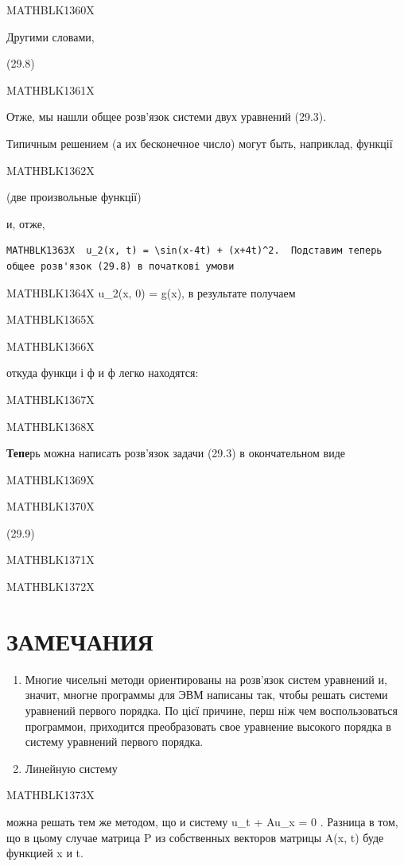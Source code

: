 \documentclass[
  ukrainian,
]{article}
\begin{document}
MATHBLK1360X

Другими словами,

(29.8)

MATHBLK1361X

Отже, мы нашли общее розв'язок системи двух уравнений (29.3).

Типичным решением (а их бесконечное число) могут быть, наприклад,
функції

MATHBLK1362X

(две произвольные функції)

и, отже,

\begin{verbatim}
MATHBLK1363X  u_2(x, t) = \sin(x-4t) + (x+4t)^2.  Подставим теперь общее розв'язок (29.8) в початкові умови
\end{verbatim}

MATHBLK1364X u\_2(x, 0) = g(x), в результате получаем

MATHBLK1365X

MATHBLK1366X

откуда функци і ф и ф легко находятся:

MATHBLK1367X

MATHBLK1368X

\textbf{Тепе}рь можна написать розв'язок задачи (29.3) в окончательном
виде

MATHBLK1369X

MATHBLK1370X

(29.9)

MATHBLK1371X

MATHBLK1372X

\section{ЗАМЕЧАНИЯ}\label{ux437ux430ux43cux435ux447ux430ux43dux438ux44f-7}

\begin{enumerate}
\def\labelenumi{\arabic{enumi}.}
\item
  Многие чисельні методи ориентированы на розв'язок систем уравнений и,
  значит, многне программы для ЭВМ написаны так, чтобы решать системи
  уравнений первого порядка. По цієї причине, перш ніж чем
  воспользоваться программои, приходится преобразовать свое уравнение
  высокого порядка в систему уравнений первого порядка.
\item
  Линейную систему
\end{enumerate}

MATHBLK1373X

можна решать тем же методом, що и систему u\_t + Au\_x = 0 . Разница в
том, що в цьому случае матрица P из собственных векторов матрицы A(x, t)
буде функцией x и t.
\end{document}
